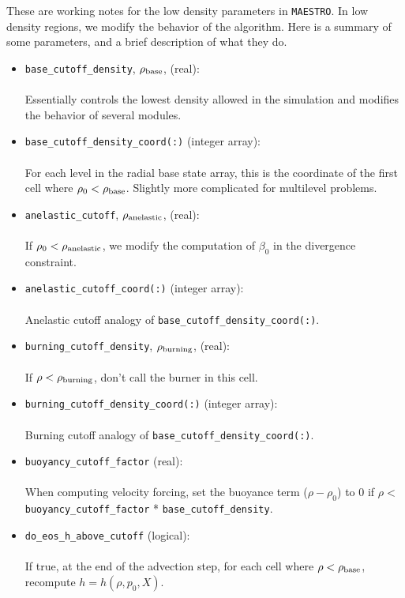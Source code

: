 These are working notes for the low density parameters in {\tt MAESTRO}.  In low density
regions, we modify the behavior of the algorithm.  Here is a summary of some parameters,
and a brief description of what they do.
\begin{itemize}
\item {\tt base\_cutoff\_density}, $\rho_{\rm base}$, (real):\\ \\
Essentially controls the lowest density allowed in the simulation and modifies the behavior
of several modules.
\item {\tt base\_cutoff\_density\_coord(:)} (integer array):\\ \\
For each level in the radial base state array, this is the coordinate of the first cell
where $\rho_0 < \rho_{\rm base}$.  Slightly more complicated for multilevel problems.
\item {\tt anelastic\_cutoff}, $\rho_{\rm anelastic}$, (real):\\ \\
If $\rho_0 < \rho_{\rm anelastic}$, we modify the computation of $\beta_0$ in the
divergence constraint.
\item {\tt anelastic\_cutoff\_coord(:)} (integer array):\\ \\
Anelastic cutoff analogy of {\tt base\_cutoff\_density\_coord(:)}.
\item {\tt burning\_cutoff\_density}, $\rho_{\rm burning}$,  (real):\\ \\
If $\rho < \rho_{\rm burning}$, don't call the burner in this cell.
\item {\tt burning\_cutoff\_density\_coord(:)} (integer array):\\ \\
Burning cutoff analogy of {\tt base\_cutoff\_density\_coord(:)}.
\item {\tt buoyancy\_cutoff\_factor} (real):\\ \\
When computing velocity forcing, set the buoyance term ($\rho-\rho_0$) to 0 if 
$\rho < $ {\tt buoyancy\_cutoff\_factor} * {\tt base\_cutoff\_density}.
\item {\tt do\_eos\_h\_above\_cutoff} (logical):\\ \\
If {\rm true}, at the end of the advection step, for each cell where 
$\rho < \rho_{\rm base}$, recompute $h = h(\rho,p_0,X)$.
\end{itemize}

